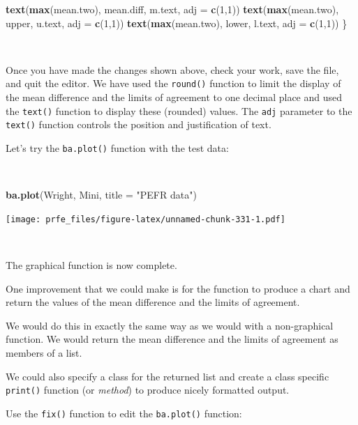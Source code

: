 \documentclass[12pt,a4paper]{book}
\newenvironment{Shaded}{\begin{snugshade}}{\end{snugshade}}
\newcommand{\DataTypeTok}[1]{\textcolor[rgb]{0.13,0.29,0.53}{#1}}
\newcommand{\DecValTok}[1]{\textcolor[rgb]{0.00,0.00,0.81}{#1}}
\newcommand{\KeywordTok}[1]{\textcolor[rgb]{0.13,0.29,0.53}{\textbf{#1}}}
\newcommand{\NormalTok}[1]{#1}
\newcommand{\StringTok}[1]{\textcolor[rgb]{0.31,0.60,0.02}{#1}}
\theoremstyle{definition}
\theoremstyle{definition}
\theoremstyle{definition}
\theoremstyle{remark}
\begin{document}
\begin{Shaded}
\begin{Highlighting}[]
  \KeywordTok{text}\NormalTok{(}\KeywordTok{max}\NormalTok{(mean.two), mean.diff, m.text, }\DataTypeTok{adj =} \KeywordTok{c}\NormalTok{(}\DecValTok{1}\NormalTok{,}\DecValTok{1}\NormalTok{)) }
  \KeywordTok{text}\NormalTok{(}\KeywordTok{max}\NormalTok{(mean.two), upper, u.text, }\DataTypeTok{adj =} \KeywordTok{c}\NormalTok{(}\DecValTok{1}\NormalTok{,}\DecValTok{1}\NormalTok{)) }
  \KeywordTok{text}\NormalTok{(}\KeywordTok{max}\NormalTok{(mean.two), lower, l.text, }\DataTypeTok{adj =} \KeywordTok{c}\NormalTok{(}\DecValTok{1}\NormalTok{,}\DecValTok{1}\NormalTok{))}
\NormalTok{\}}
\end{Highlighting}
\end{Shaded}

~

Once you have made the changes shown above, check your work, save the
file, and quit the editor. We have used the \texttt{round()} function to
limit the display of the mean difference and the limits of agreement to
one decimal place and used the \texttt{text()} function to display these
(rounded) values. The \texttt{adj} parameter to the \texttt{text()}
function controls the position and justification of text.

Let's try the \texttt{ba.plot()} function with the test data:

~

\begin{Shaded}
\begin{Highlighting}[]
\KeywordTok{ba.plot}\NormalTok{(Wright, Mini, }\DataTypeTok{title =} \StringTok{"PEFR data"}\NormalTok{)}
\end{Highlighting}
\end{Shaded}

\texttt{[image: prfe\_files/figure-latex/unnamed-chunk-331-1.pdf]}

~

The graphical function is now complete.

One improvement that we could make is for the function to produce a
chart and return the values of the mean difference and the limits of
agreement.

We would do this in exactly the same way as we would with a
non-graphical function. We would return the mean difference and the
limits of agreement as members of a list.

We could also specify a class for the returned list and create a class
specific \texttt{print()} function (or \emph{method}) to produce nicely
formatted output.

Use the \texttt{fix()} function to edit the \texttt{ba.plot()} function:
\end{document}

